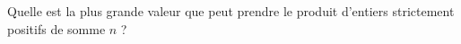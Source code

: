 Quelle est la plus grande valeur que peut prendre le produit d'entiers strictement positifs de somme $n$ ?